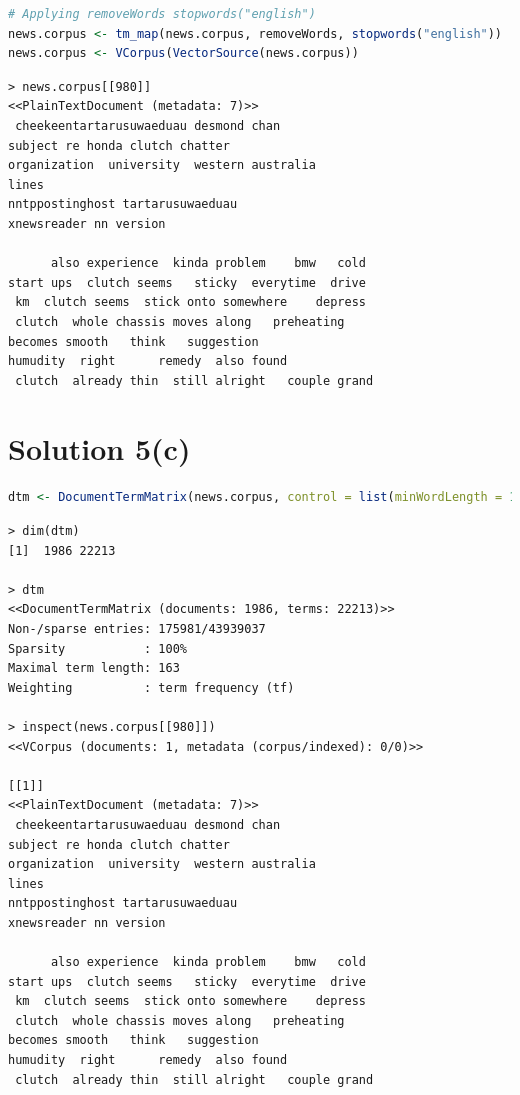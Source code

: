 \documentclass[a4paper,20pt]{article}
\begin{document}
\begin{lstlisting}[language = R]
# Applying removeWords stopwords("english")
news.corpus <- tm_map(news.corpus, removeWords, stopwords("english"))
news.corpus <- VCorpus(VectorSource(news.corpus))
\end{lstlisting}
\begin{verbatim}
> news.corpus[[980]]
<<PlainTextDocument (metadata: 7)>>
 cheekeentartarusuwaeduau desmond chan
subject re honda clutch chatter
organization  university  western australia
lines 
nntppostinghost tartarusuwaeduau
xnewsreader nn version  

      also experience  kinda problem    bmw   cold
start ups  clutch seems   sticky  everytime  drive  
 km  clutch seems  stick onto somewhere    depress
 clutch  whole chassis moves along   preheating 
becomes smooth   think   suggestion   
humudity  right      remedy  also found  
 clutch  already thin  still alright   couple grand
\end{verbatim}

\section*{Solution 5(c)}
\begin{lstlisting}[language = R]
dtm <- DocumentTermMatrix(news.corpus, control = list(minWordLength = 1, minDocFreq = 1))
\end{lstlisting}
\begin{verbatim}
> dim(dtm)
[1]  1986 22213

> dtm
<<DocumentTermMatrix (documents: 1986, terms: 22213)>>
Non-/sparse entries: 175981/43939037
Sparsity           : 100%
Maximal term length: 163
Weighting          : term frequency (tf)

> inspect(news.corpus[[980]])
<<VCorpus (documents: 1, metadata (corpus/indexed): 0/0)>>

[[1]]
<<PlainTextDocument (metadata: 7)>>
 cheekeentartarusuwaeduau desmond chan
subject re honda clutch chatter
organization  university  western australia
lines 
nntppostinghost tartarusuwaeduau
xnewsreader nn version  

      also experience  kinda problem    bmw   cold
start ups  clutch seems   sticky  everytime  drive  
 km  clutch seems  stick onto somewhere    depress
 clutch  whole chassis moves along   preheating 
becomes smooth   think   suggestion   
humudity  right      remedy  also found  
 clutch  already thin  still alright   couple grand
\end{verbatim}
\end{document}

